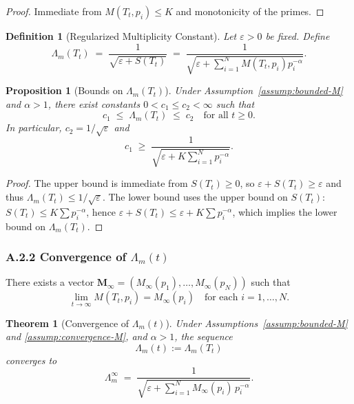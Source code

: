 \documentclass[11pt]{article}
\newtheorem{theorem}{Theorem}
\newtheorem{definition}{Definition}
\newtheorem{proposition}{Proposition}
\begin{document}
\begin{proof}
Immediate from $M(T_t,p_i)\le K$ and monotonicity of the primes.
\end{proof}

\begin{definition}[Regularized Multiplicity Constant]
Let $\varepsilon>0$ be fixed. Define
\begin{equation}
  \Lambda_m(T_t)
  \;=\;
  \frac{1}{\sqrt{\varepsilon + S(T_t)}}
  \;=\;
  \frac{1}{\sqrt{\varepsilon + \sum_{i=1}^N M(T_t,p_i)p_i^{-\alpha}}}.
  \label{eq:lambda-regularized}
\end{equation}
\end{definition}

\begin{proposition}[Bounds on $\Lambda_m(T_t)$]
Under Assumption~\ref{assump:bounded-M} and $\alpha>1$, there exist constants $0<c_1\le c_2<\infty$ such that
\begin{equation}
  c_1 \;\leq\; \Lambda_m(T_t) \;\leq\; c_2
  \quad\text{for all } t \ge 0.
\end{equation}
In particular, $c_2 = 1/\sqrt{\varepsilon}$ and
\begin{equation}
  c_1 \;\geq\; \frac{1}{\sqrt{\varepsilon + K \sum_{i=1}^N p_i^{-\alpha}}}.
\end{equation}
\end{proposition}

\begin{proof}
The upper bound is immediate from $S(T_t)\ge 0$, so $\varepsilon + S(T_t)\ge \varepsilon$ and thus $\Lambda_m(T_t)\le 1/\sqrt{\varepsilon}$. The lower bound uses the upper bound on $S(T_t)$: $S(T_t)\le K\sum p_i^{-\alpha}$, hence $\varepsilon+S(T_t)\le \varepsilon + K \sum p_i^{-\alpha}$, which implies the lower bound on $\Lambda_m(T_t)$.
\end{proof}

\subsubsection*{A.2.2 Convergence of $\Lambda_m(t)$}

\begin{assumption}\label{assump:convergence-M}
There exists a vector $\bm{M}_\infty = (M_\infty(p_1),\dots,M_\infty(p_N))$ such that
\[
  \lim_{t\to\infty} M(T_t,p_i) = M_\infty(p_i)
  \quad\text{for each } i=1,\dots,N.
\]
\end{assumption}

\begin{theorem}[Convergence of $\Lambda_m(t)$]\label{thm:lambda-convergence}
Under Assumptions~\ref{assump:bounded-M} and \ref{assump:convergence-M}, and $\alpha>1$, the sequence
\[
  \Lambda_m(t) := \Lambda_m(T_t)
\]
converges to
\begin{equation}
  \Lambda_m^\infty
  \;=\;
  \frac{1}{\sqrt{\varepsilon + \sum_{i=1}^N M_\infty(p_i)\, p_i^{-\alpha}}}.
\end{equation}
\end{theorem}
\end{document}
